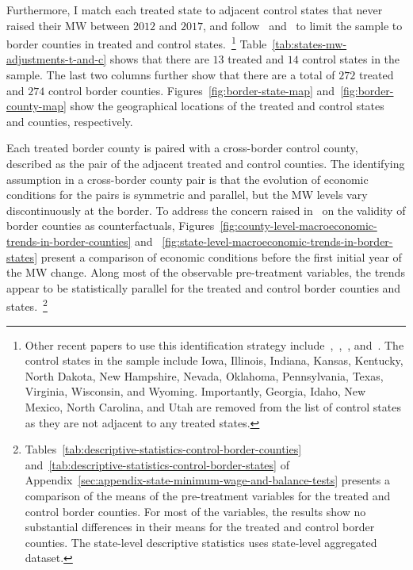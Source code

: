 \documentclass{C:/Users/david/OneDrive/Documents/ULMS/PhD/Thesis/chapter3/src/climate_change/latex/Economic_Journal/OUP-EJ}
\begin{document}
    Furthermore, I match each treated state to adjacent control states that never raised their MW between $2012$ and $2017$, and follow~\citet{dube2010minimum} and~\citet{gopalan2021state} to limit the sample to border counties in treated and control states.~\footnote{\tiny Other recent papers to use this identification strategy include~\citet{aaronson2018industry},~\citet{dube2019fairness},~\citet{jardim2018minimum}, and~\citet{zhang2019distributional}. The control states in the sample include Iowa, Illinois, Indiana, Kansas, Kentucky, North Dakota, New Hampshire, Nevada, Oklahoma, Pennsylvania, Texas, Virginia, Wisconsin, and Wyoming. Importantly, Georgia, Idaho, New Mexico, North Carolina, and Utah are removed from the list of control states as they are not adjacent to any treated states.} Table~\ref{tab:states-mw-adjustments-t-and-c} shows that there are $13$ treated and $14$ control states in the sample. The last two columns further show that there are a total of $272$ treated and $274$ control border counties. Figures~\ref{fig:border-state-map} and~\ref{fig:border-county-map} show the geographical locations of the treated and control states and counties, respectively.
    
    

    Each treated border county is paired with a cross-border control county, described as the pair of the adjacent treated and control counties. The identifying assumption in a cross-border county pair is that the evolution of economic conditions for the pairs is symmetric and parallel, but the MW levels vary discontinuously at the border. To address the concern raised in~\citet{neumark2014revisiting} on the validity of border counties as counterfactuals, Figures~\ref{fig:county-level-macroeconomic-trends-in-border-counties} and ~\ref{fig:state-level-macroeconomic-trends-in-border-states} present a comparison of economic conditions before the first initial year of the MW change. Along most of the observable pre-treatment variables, the trends appear to be statistically parallel for the treated and control border counties and states.~\footnote{\tiny Tables~\ref{tab:descriptive-statistics-control-border-counties} and~\ref{tab:descriptive-statistics-control-border-states} of Appendix~\ref{sec:appendix-state-minimum-wage-and-balance-tests} presents a comparison of the means of the pre-treatment variables for the treated and control border counties. For most of the variables, the results show no substantial differences in their means for the treated and control border counties. The state-level descriptive statistics uses state-level aggregated dataset.}
\end{document}
